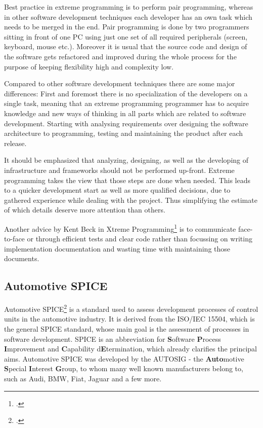 Best practice in extreme programming is to perform pair programming, whereas in other software development techniques each developer has an 
own task which needs to be merged in the end. Pair programming is done by two programmers sitting in front of one PC using just one set of 
all required peripherals (screen, keyboard, mouse etc.). Moreover it is usual that the source code and design of the software gets refactored 
and improved during the whole process for the purpose of keeping flexibility high and complexity low.

Compared to other software development techniques there are some major differences: First and foremost there is no specialization of the 
developers on a single task, meaning that an extreme programming programmer has to acquire knowledge and new ways of thinking in all parts 
which are related to software development. Starting with analysing requirements over designing the software architecture to programming, 
testing and maintaining the product after each release.

It should be emphasized that analyzing, designing, as well as the developing of infrastructure and frameworks should not be performed 
up-front. Extreme programming takes the view that those steps are done when needed. This leads to a quicker development start as well 
as more qualified decisions, due to gathered experience while dealing with the project. Thus simplifying the estimate of which details 
deserve more attention than others.

Another advice by Kent Beck in Xtreme Programming\footcite{BECK} is to communicate face-to-face or through efficient tests and 
clear code rather than focussing on writing implementation documentation and wasting time with maintaining those documents.

\subsection{Automotive SPICE}

Automotive SPICE\footcite{AUTOSPICE} is a standard used to assess development processes of control units in the automotive industry. It is derived from the 
ISO/IEC 15504, which is the general SPICE standard, whose main goal is the assessment of processes in software development. SPICE is an 
abbreviation for \textbf{S}oftware \textbf{P}rocess \textbf{I}mprovement and \textbf{C}apability d\textbf{E}termination, which already 
clarifies the principal aims. Automotive SPICE was developed by  the AUTOSIG - the \textbf{Auto}motive \textbf{S}pecial \textbf{I}nterest 
\textbf{G}roup, to whom many well known manufacturers belong to, such as Audi, BMW, Fiat, Jaguar and a few more.

